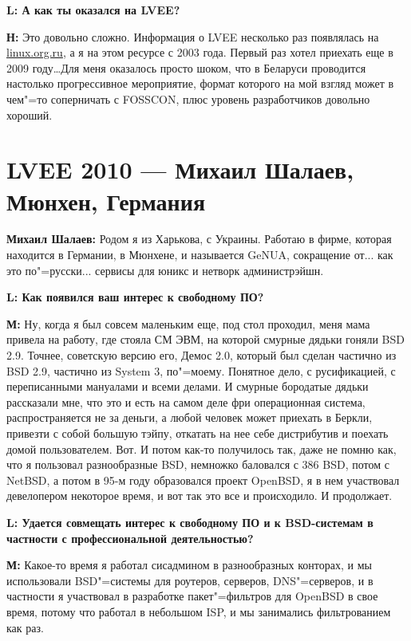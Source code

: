 \documentclass[10pt, a5paper]{article}
\begin{document}
{\noindent \bf L: А как ты оказался на LVEE?}

{\noindent \bf Н:} Это довольно сложно. Информация о LVEE несколько раз появлялась на \url{linux.org.ru}, а я на этом ресурсе с 2003 года. 
Первый раз хотел приехать еще в 2009 году\ldots Для меня оказалось просто шоком, что в Беларуси проводится настолько прогрессивное мероприятие, формат которого на мой взгляд может в чем"=то соперничать с FOSSCON, плюс уровень разработчиков довольно хороший. 

\section*{\flushleft LVEE 2010 --- Михаил Шалаев, \linebreak Мюнхен, Германия}


{\noindent \bf Михаил Шалаев:} Родом я из Харькова, с Украины. Работаю в фирме, которая находится в Германии, в Мюнхене, и называется GeNUA, сокращение от...  как это по"=русски... сервисы для юникс и нетворк администрэйшн.

{\noindent \bf L: Как появился ваш интерес к свободному ПО?}

{\noindent \bf М:} Ну, когда я был совсем маленьким еще, под стол проходил, меня мама привела на работу, где стояла СМ ЭВМ, на которой смурные дядьки гоняли BSD 2.9. Точнее, советскую версию его, Демос 2.0, который был сделан частично из BSD 2.9, частично из System 3, по"=моему. Понятное дело, с русификацией, с переписанными мануалами и всеми делами. И смурные бородатые дядьки рассказали мне, что это и есть на самом деле фри операционная система, распространяется не за деньги, а любой человек может приехать в Беркли, привезти с собой большую тэйпу, откатать на нее себе дистрибутив и поехать домой пользователем. Вот. И потом как-то получилось так, даже не помню как, что я пользовал разнообразные BSD, немножко баловался с 386 BSD, потом с NetBSD, а потом в 95-м году образовался проект OpenBSD, я в нем участвовал девелопером некоторое время, и вот так это все и происходило. И продолжает.

{\noindent \bf L:  Удается совмещать интерес к свободному ПО и к BSD-системам в частности с профессиональной деятельностью?}

{\noindent \bf М:} Какое-то время я работал сисадмином в разнообразных конторах, и мы использовали BSD"=системы для роутеров, серверов, DNS"=серверов, и в частности я участвовал в разработке пакет"=фильтров для OpenBSD в свое время, потому что работал в небольшом ISP, и мы занимались фильтрованием как раз. 
\end{document}
